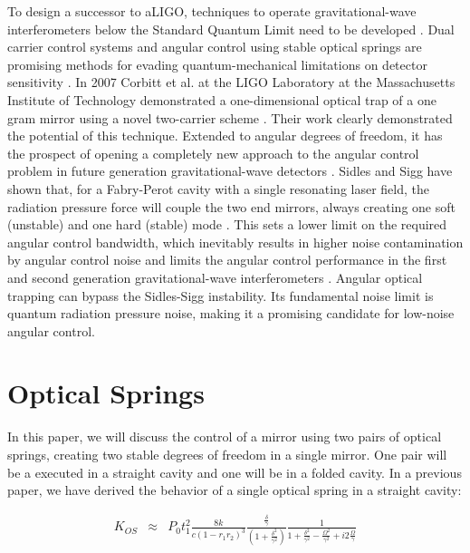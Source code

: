 To design a successor to aLIGO, techniques to operate gravitational-wave interferometers below 
the Standard Quantum Limit need to be developed \cite{Dan12, Chen13}. Dual carrier control systems and angular control 
using stable optical springs are promising methods for evading quantum-mechanical limitations on 
detector sensitivity \cite{LIGO10, Braginsky02b, Arcizet06b, Corbitt06b, Kippenberg05, Sheard04}. 
In 2007 Corbitt et al. at the LIGO Laboratory at the Massachusetts Institute of Technology 
demonstrated a one-dimensional optical trap of a one gram mirror using a novel two-carrier scheme \cite{Corbitt07}. 
Their work 
clearly demonstrated the potential of this technique. Extended to angular degrees of freedom, it has 
the prospect of opening a completely new approach to the angular control problem in future generation 
gravitational-wave detectors \cite{Punturo10}. 
Sidles and Sigg have shown that, for a Fabry-Perot cavity with a single 
resonating laser field, the radiation pressure force will couple the two end mirrors, always creating one 
soft (unstable) and one hard (stable) mode \cite{Sidles06}. This sets a lower limit on the required angular control 
bandwidth, which inevitably results in higher noise contamination by angular control noise and limits the angular control performance in the first and second generation 
gravitational-wave interferometers \cite{LIGO10, Braginsky01, Dooley13, Hirose10}. 
Angular optical trapping can bypass the Sidles-Sigg instability. Its fundamental noise limit is quantum radiation pressure noise, making it a promising candidate for low-noise angular control.


\section{Optical Springs}
In this paper, we will discuss the control of a mirror using two pairs of optical springs, creating two stable degrees of freedom in a single mirror. One pair will be a executed in a straight cavity and one will be in a folded cavity. In a previous paper, we have derived the behavior of a single optical spring in a straight cavity:

\begin{eqnarray}
\label{eq:KOSlong}
K_{OS} & {\approx} & P_0 t_1^2 \frac{8k}{c(1-r_1r_2)^3}\frac{ \frac{\delta}{\gamma}}{(1+\frac{\delta^2}{\gamma^2})} 
\frac{1}{1+\frac{\delta^2}{\gamma^2}-\frac{\Omega^2}{\gamma^2}+i2\frac{\Omega}{\gamma} }
\end{eqnarray}

